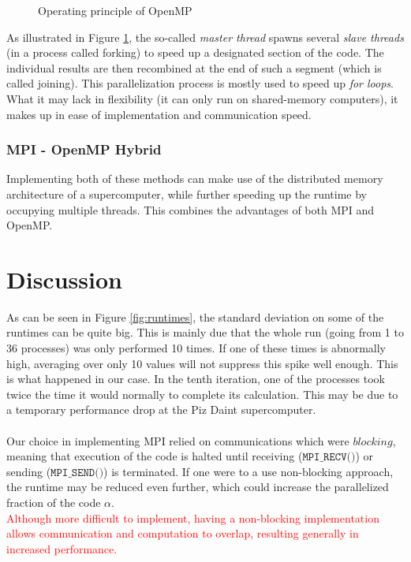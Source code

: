 \documentclass[12pt, a4paper, titlepage]{article}
\begin{document}
{\begin{figure}[h!]
\caption{Operating principle of OpenMP}
\label{fig:openmp}
\end{figure}


As illustrated in Figure \ref{fig:openmp}, the so-called \textit{master thread} spawns several \textit{slave threads} (in a process called forking) to speed up a designated section of the code. The individual results are then recombined at the end of such a segment (which is called joining). This parallelization process is mostly used to speed up \textit{for loops}.\\
What it may lack in flexibility (it can only run on shared-memory computers), it makes up in ease of implementation and communication speed. 




\subsubsection{MPI - OpenMP Hybrid}

Implementing both of these methods can make use of the distributed memory architecture of a supercomputer, while further speeding up the runtime by occupying multiple threads. This combines the advantages of both MPI and OpenMP.



\newpage
\section{Discussion}


As can be seen in Figure \ref{fig:runtimes}, the standard deviation on some of the runtimes can be quite big. This is mainly due that the whole run (going from 1 to 36 processes) was only performed 10 times. If one of these times is abnormally high, averaging over only 10 values will not suppress this spike well enough. This is what happened in our case. In the tenth iteration, one of the processes took twice the time it would normally to complete its calculation. This may be due to a temporary performance drop at the Piz Daint supercomputer.\\\\
Our choice in implementing MPI relied on communications which were $\textit{blocking}$, meaning that execution of the code is halted until receiving ($\texttt{MPI\_RECV()}$) or sending ($\texttt{MPI\_SEND()}$) is terminated. If one were to a use non-blocking approach, the runtime may be reduced even further, which could increase the parallelized fraction of the code $\alpha$.\\
\textcolor{red}{Although more difficult to implement, having a non-blocking implementation allows communication and computation to overlap, resulting generally in increased performance.}

}
\end{document}
